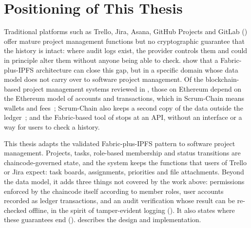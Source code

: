 \section{Positioning of This Thesis}
\label{sec:positioning}

Traditional platforms such as Trello, Jira, Asana, GitHub Projects and GitLab () offer mature project management functions but no cryptographic guarantee that the history is intact: where audit logs exist, the provider controls them and could in principle alter them without anyone being able to check. \textcite{adel2023} show that a Fabric-plus-IPFS architecture can close this gap, but in a specific domain whose data model does not carry over to software project management. Of the blockchain-based project management systems reviewed in , those on Ethereum depend on the Ethereum model of accounts and transactions, which in Scrum-Chain means wallets and fees~\cite{qureshi2024chainagile,silva_scrumchain}; Scrum-Chain also keeps a second copy of the data outside the ledger~\cite{silva_scrumchain}; and the Fabric-based tool of \textcite{batista2021} stops at an API, without an interface or a way for users to check a history.

This thesis adapts the validated Fabric-plus-IPFS pattern to software project management. Projects, tasks, role-based membership and status transitions are chaincode-governed state, and the system keeps the functions that users of Trello or Jira expect: task boards, assignments, priorities and file attachments. Beyond the data model, it adds three things not covered by the work above: permissions enforced by the chaincode itself according to member roles, user accounts recorded as ledger transactions, and an audit verification whose result can be re-checked offline, in the spirit of tamper-evident logging (). It also states where these guarantees end ().  describes the design and implementation.
